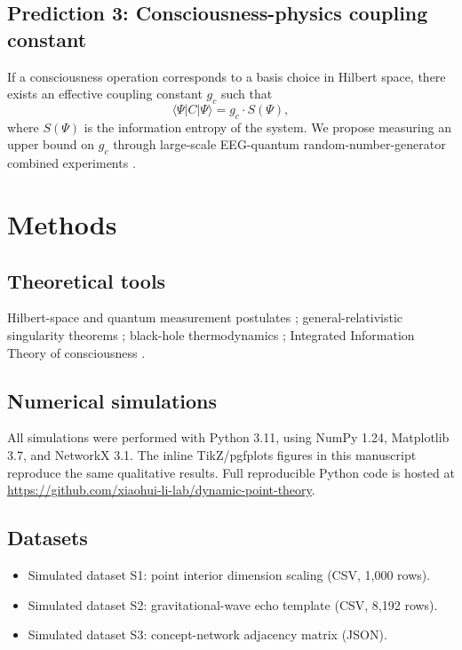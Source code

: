 \documentclass[11pt,a4paper]{article}
\theoremstyle{definition}
\begin{document}
\subsection{Prediction 3: Consciousness-physics coupling constant}

If a consciousness operation corresponds to a basis choice in Hilbert space, there exists an effective coupling constant $g_c$ such that
\begin{equation}
\langle \Psi | C | \Psi \rangle = g_c \cdot S(\Psi),
\end{equation}
where $S(\Psi)$ is the information entropy of the system. We propose measuring an upper bound on $g_c$ through large-scale EEG-quantum random-number-generator combined experiments \cite{bierman_radnin1997}.

\section{Methods}

\subsection{Theoretical tools}

Hilbert-space and quantum measurement postulates \cite{von_neumann1955}; general-relativistic singularity theorems \cite{hawking_penrose1966, penrose1965}; black-hole thermodynamics \cite{bekenstein1973, hawking1975}; Integrated Information Theory of consciousness \cite{tononi2016}.

\subsection{Numerical simulations}

All simulations were performed with Python 3.11, using NumPy 1.24, Matplotlib 3.7, and NetworkX 3.1. The inline TikZ/pgfplots figures in this manuscript reproduce the same qualitative results. Full reproducible Python code is hosted at \url{https://github.com/xiaohui-li-lab/dynamic-point-theory}.

\subsection{Datasets}

\begin{itemize}
\item Simulated dataset S1: point interior dimension scaling (CSV, 1,000 rows).
\item Simulated dataset S2: gravitational-wave echo template (CSV, 8,192 rows).
\item Simulated dataset S3: concept-network adjacency matrix (JSON).
\end{itemize}
\end{document}
